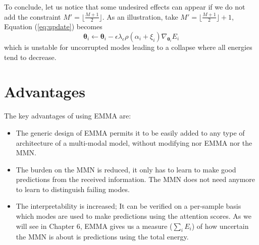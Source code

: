 To conclude, let us notice that some undesired effects can appear if we do not add the constraint $M' = \lfloor \frac{M+1}{2} \rfloor$. As an illustration, take $M' = \lfloor \frac{M+1}{2} \rfloor + 1$, Equation (\ref{eq:update}) becomes
\begin{equation}
\bm{\theta}_i \leftarrow \bm{\theta}_i - \epsilon\lambda_e\rho(\alpha_i + \xi_i)\nabla_{\bm{\theta}_i}E_i
\end{equation}
which is unstable for uncorrupted modes leading to a collapse where all energies tend to decrease.


\section{Advantages}
The key advantages of using EMMA are:
\begin{itemize}
\item The generic design of EMMA permits it to be easily added to any type of architecture of a multi-modal model, without modifying nor EMMA nor the MMN.
\item The burden on the MMN is reduced, it only has to learn to make good predictions from the received information. The MMN does not need anymore to learn to distinguish failing modes.
\item The interpretability is increased; It can be verified on a per-sample basis which modes are used to make predictions using the attention scores. As we will see in Chapter 6, EMMA gives us a measure ($\sum_i E_i$) of how uncertain the MMN is about is predictions using the total energy.
\end{itemize}


